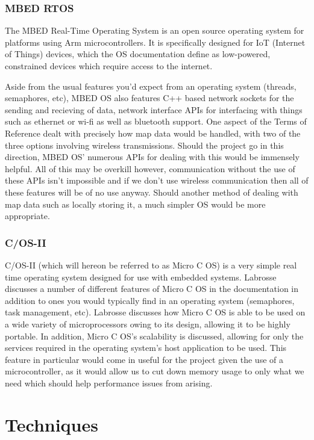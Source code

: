 					\subsubsection{MBED RTOS}
					The MBED Real-Time Operating System is an open source operating system for platforms using Arm microcontrollers. It is specifically designed for IoT (Internet of Things) devices, which the OS documentation\citep{mbedrtosdocs} define as low-powered, constrained devices which require access to the internet.
					
					Aside from the usual features you'd expect from an operating system (threads, semaphores, etc), MBED OS also features C++ based network sockets for the sending and recieving of data, network interface APIs for interfacing with things such as ethernet or wi-fi as well as bluetooth support. One aspect of the Terms of Reference dealt with precisely how map data would be handled, with two of the three options involving wireless transmissions. Should the project go in this direction, MBED OS' numerous APIs for dealing with this would be immensely helpful. All of this may be overkill however, communication without the use of these APIs isn't impossible and if we don't use wireless communication then all of these features will be of no use anyway. Should another method of dealing with map data such as locally storing it, a much simpler OS would be more appropriate.
					
					\subsubsection{\textmu C/OS-II}
					\textmu C/OS-II (which will hereon be referred to as Micro C OS) is a very simple real time operating system designed for use with embedded systems. Labrosse\citep{labrosse2002microc} discusses a number of different features of Micro C OS in the documentation in addition to ones you would typically find in an operating system (semaphores, task management, etc). Labrosse discusses how Micro C OS is able to be used on a wide variety of microprocessors owing to its design, allowing it to be highly portable. In addition, Micro C OS's scalability is discussed, allowing for only the services required in the operating system's host application to be used. This feature in particular would come in useful for the project given the use of a microcontroller, as it would allow us to cut down memory usage to only what we need which should help performance issues from arising.
			
			
			\section{Techniques}
			
